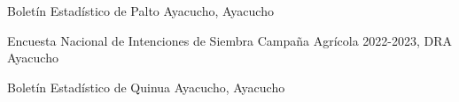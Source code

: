 
\begin{scholarship}

					{Boletín Estadístico de Palto Ayacucho, Ayacucho}
					
					{Encuesta Nacional de Intenciones de Siembra Campaña Agrícola 2022-2023, DRA Ayacucho}
					
					{Boletín Estadístico de Quinua Ayacucho, Ayacucho}
					
\end{scholarship}
